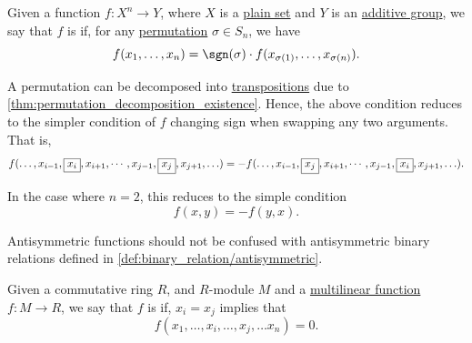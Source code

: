 \begin{definition}\label{def:antisymmetric_function}\mimprovised
  Given a function \( f: X^n \to Y \), where \( X \) is a \hyperref[def:set]{plain set} and \( Y \) is an \hyperref[def:additive_semigroup]{additive group}, we say that \( f \) is  if, for any \hyperref[def:symmetric_group]{permutation} \( \sigma \in S_n \), we have
  \begin{equation*}
    f(x_1, \ldots, x_n) = \sgn(\sigma) \cdot f(x_{\sigma(1)}, \ldots, x_{\sigma(n)}).
  \end{equation*}

  A permutation can be decomposed into \hyperref[def:cyclic_permutation]{transpositions} due to \cref{thm:permutation_decomposition_existence}. Hence, the above condition reduces to the simpler condition of \( f \) changing sign when swapping any two arguments. That is,
  \begin{equation*}
    f(\ldots, x_{i-1}, \fbox{\( x_i \)}, x_{i+1}, \cdots, x_{j-1}, \fbox{\( x_j \)}, x_{j+1}, \ldots)
    =
    -f(\ldots, x_{i-1}, \fbox{\( x_j \)}, x_{i+1}, \cdots, x_{j-1}, \fbox{\( x_i \)}, x_{j+1}, \ldots).
  \end{equation*}

  In the case where \( n = 2 \), this reduces to the simple condition
  \begin{equation*}
    f(x, y) = -f(y, x).
  \end{equation*}

  Antisymmetric functions should not be confused with antisymmetric binary relations defined in \cref{def:binary_relation/antisymmetric}.
\end{definition}

\begin{definition}\label{def:alternating_function}\mimprovised
  Given a commutative ring \( R \), and \( R \)-module \( M \) and a \hyperref[def:multilinear_function]{multilinear function} \( f: M \to R \), we say that \( f \) is  if, \( x_i = x_j \) implies that
  \begin{equation*}
    f(x_1, \ldots, x_i, \ldots, x_j, \ldots x_n) = 0.
  \end{equation*}
\end{definition}

